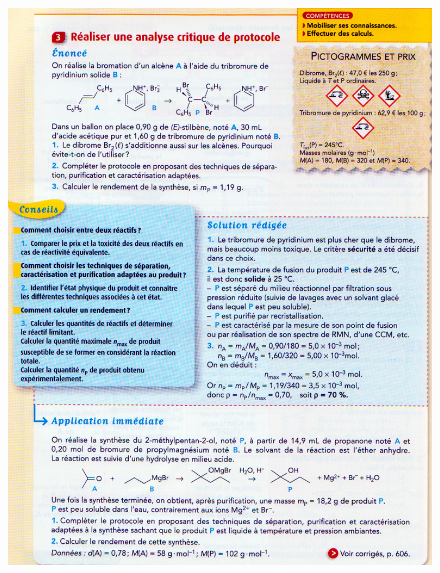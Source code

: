 \documentclass[11pt,a4paper]{article}
\begin{document}
\begin{figure}[H]
    \centering
    \includegraphics[width=\linewidth]{imgs/c5/xosynth2.jpg}
\end{figure}
\end{document}

